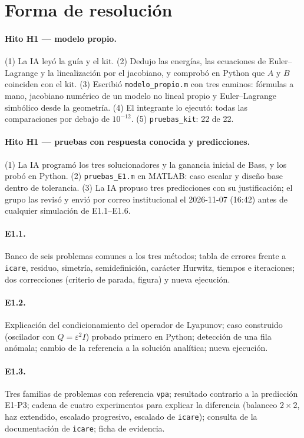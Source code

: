 \documentclass[11pt,a4paper]{article}
\begin{document}
\section{Forma de resolución}

\paragraph{Hito H1 — modelo propio.}
(1) La IA leyó la guía y el kit. (2) Dedujo las energías, las ecuaciones de Euler--Lagrange y la
linealización por el jacobiano, y comprobó en Python que $A$ y $B$ coinciden con el kit.
(3) Escribió \texttt{modelo\_propio.m} con tres caminos: fórmulas a mano, jacobiano numérico de un
modelo no lineal propio y Euler--Lagrange simbólico desde la geometría. (4) El integrante lo ejecutó:
todas las comparaciones por debajo de $10^{-12}$. (5) \texttt{pruebas\_kit}: 22 de 22.

\paragraph{Hito H1 — pruebas con respuesta conocida y predicciones.}
(1) La IA programó los tres solucionadores y la ganancia inicial de Bass, y los probó en Python.
(2) \texttt{pruebas\_E1.m} en MATLAB: caso escalar y diseño base dentro de tolerancia. (3) La IA propuso
tres predicciones con su justificación; el grupo las revisó y envió por correo institucional el
2026-11-07 (16:42) antes de cualquier simulación de E1.1--E1.6.

\paragraph{E1.1.}
Banco de seis problemas comunes a los tres métodos; tabla de errores frente a \texttt{icare}, residuo,
simetría, semidefinición, carácter Hurwitz, tiempos e iteraciones; dos correcciones (criterio de parada,
figura) y nueva ejecución.

\paragraph{E1.2.}
Explicación del condicionamiento del operador de Lyapunov; caso construido (oscilador con
$Q=\varepsilon^2I$) probado primero en Python; detección de una fila anómala; cambio de la referencia a
la solución analítica; nueva ejecución.

\paragraph{E1.3.}
Tres familias de problemas con referencia \texttt{vpa}; resultado contrario a la predicción E1-P3;
cadena de cuatro experimentos para explicar la diferencia (balanceo $2\times2$, haz extendido, escalado
progresivo, escalado de \texttt{icare}); consulta de la documentación de \texttt{icare}; ficha de evidencia.
\end{document}

